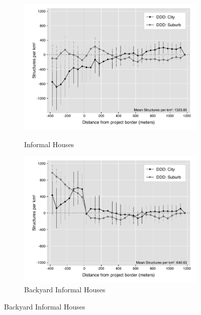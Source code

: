 \documentclass[12pt]{article}
\begin{document}
\begin{figure}[t!]
\begin{subfigure}[b]{0.49\textwidth}
        \label{fig:DDDformal_het}
    \end{subfigure}
    \vskip 1mm \vskip 0pt
    \begin{subfigure}[b]{0.49\textwidth}
        \centering
        \caption[]{\small Informal Houses}
        \vspace{-1mm}
        \includegraphics[width=\textwidth,trim={.5cm .3cm .3cm 0cm}, clip=true]{figures/distplotDDD_bblu_inf_admin_het_5.pdf}
        \label{fig:DDDinformal_het}
    \end{subfigure}
    \hfill
    \begin{subfigure}[b]{0.49\textwidth}  
        \centering
        \caption[]{\small Backyard Informal Houses}  
        \vspace{-1mm}
        \includegraphics[width=\textwidth,trim={.5cm .3cm .3cm 0cm}, clip=true]{figures/distplotDDD_bblu_inf_backyard_admin_het_5.pdf}

\end{subfigure}
\end{figure}
\end{document}
